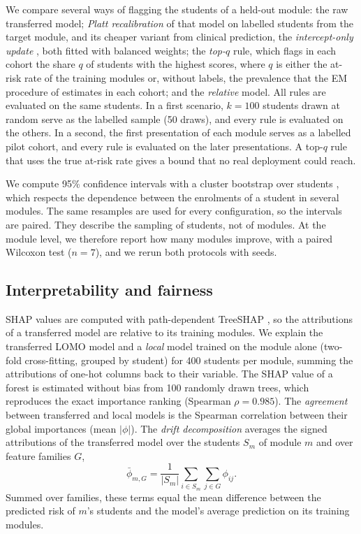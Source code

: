 \documentclass[fleqn,10pt]{JLA_article}
\begin{document}
We compare several ways of flagging the students of a held-out module: the raw transferred model; \emph{Platt recalibration} \parencite{platt1999probabilistic} of that model on labelled students from the target module, and its cheaper variant from clinical prediction, the \emph{intercept-only update} \parencite{janssen2008updating}, both fitted with balanced weights; the \emph{top-$q$} rule, which flags in each cohort the share $q$ of students with the highest scores, where $q$ is either the at-risk rate of the training modules or, without labels, the prevalence that the EM procedure of \textcite{saerens2002priors} estimates in each cohort; and the \emph{relative} model. All rules are evaluated on the same students. In a first scenario, $k=100$ students drawn at random serve as the labelled sample (50 draws), and every rule is evaluated on the others. In a second, the first presentation of each module serves as a labelled pilot cohort, and every rule is evaluated on the later presentations. A top-$q$ rule that uses the true at-risk rate gives a bound that no real deployment could reach.

We compute 95\% confidence intervals with a cluster bootstrap over students \parencite[1{,}000 resamples;][]{efron1993bootstrap}, which respects the dependence between the enrolments of a student in several modules. The same resamples are used for every configuration, so the intervals are paired. They describe the sampling of students, not of modules. At the module level, we therefore report how many modules improve, with a paired Wilcoxon test ($n=7$), and we rerun both protocols with \resNSeeds{} seeds.

\subsection{Interpretability and fairness}
SHAP values \parencite{lundberg2017shap} are computed with path-dependent TreeSHAP \parencite{lundberg2020treeshap}, so the attributions of a transferred model are relative to its training modules. We explain the transferred LOMO model and a \emph{local} model trained on the module alone (two-fold cross-fitting, grouped by student) for 400 students per module, summing the attributions of one-hot columns back to their variable. The SHAP value of a forest is estimated without bias from 100 randomly drawn trees, which reproduces the exact importance ranking (Spearman $\rho=0.985$). The \emph{agreement} between transferred and local models is the Spearman correlation between their global importances (mean $|\phi|$). The \emph{drift decomposition} averages the signed attributions of the transferred model over the students $S_m$ of module $m$ and over feature families $G$,
\begin{equation}
\bar{\phi}_{m,G} = \frac{1}{|S_m|}\sum_{i\in S_m}\sum_{j\in G}\phi_{ij}.
\label{eq:decomp}
\end{equation}
Summed over families, these terms equal the mean difference between the predicted risk of $m$'s students and the model's average prediction on its training modules.
\end{document}
